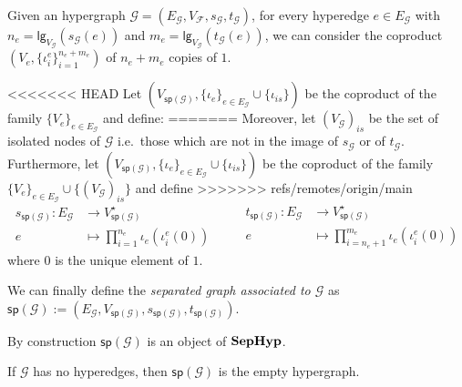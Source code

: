 \documentclass[3p]{elsarticle}
\newcommand{\lgh}{\mathsf{lg}}
\newcommand{\catname}[1]{\textbf{\textup{#1}}}
\newcommand{\shyp}{\catname{SepHyp}}
\renewcommand{\sp}{\mathsf{sp}}
\newcommand{\is}[1]{{#1}_{is}}
\theoremstyle{remark}
\theoremstyle{definition}
\begin{document}
\begin{defi}
Given an hypergraph $\mathcal{\mathcal{G}}=(E_{\mathcal{G}}, V_{\mathcal{F}}, s_{\mathcal{G}}, t_{\mathcal{G}})$, for every hyperedge $e\in E_{\mathcal{G}}$ with $n_e=\lgh_{V_{\mathcal{G}}}(s_{\mathcal{G}}(e))$ and $m_e=\lgh_{V_{\mathcal{G}}}(t_{\mathcal{G}}(e))$, we can consider the coproduct $(V_e, \{\iota^e_{i}\}_{i=1}^{n_e+m_e})$ of $n_e+m_e$ copies of $1$.

<<<<<<< HEAD
Let $(V_{\sp(\mathcal{G})}, \{\iota_e\}_{e\in E_{\mathcal{G}}} \cup \{\iota_{is}\})$ be the coproduct of the family $\{V_{e}\}_{e\in E_\mathcal{G}}$ and define:
=======
 Moreover, let $\is{(V_{\mathcal{G}})}$ be the set of isolated nodes  of $\mathcal{G}$ i.e.~those which are not in the image of $s_{\mathcal{G}}$ or of $t_{\mathcal{G}}$. Furthermore, let $(V_{\sp(\mathcal{G})}, \{\iota_e\}_{e\in E_{\mathcal{G}}} \cup \{\iota_{is}\})$ be the coproduct of the family $\{V_{e}\}_{e\in E_\mathcal{G}} \cup \{\is{(V_{\mathcal{G}})}\}$ and define
>>>>>>> refs/remotes/origin/main
\[\begin{split}
	s_{\sp(\mathcal{G})} \colon E_{\mathcal{G}}&\to V_{\sp(\mathcal{G})}^\star\\
	e &\mapsto \prod_{i=1}^{n_e} \iota_e(\iota^e_{i}(0))
\end{split}\qquad \begin{split}
	t_{\sp(\mathcal{G})} \colon E_{\mathcal{G}}&\to V_{\sp(\mathcal{G})}^\star\\
	e &\mapsto \prod_{i=n_e+1}^{m_e} \iota_e(\iota^e_{i}(0))
\end{split} \]
where $0$ is the unique element of $1$. 

We can finally define the \emph{separated graph associated to $\mathcal{G}$}  as $\sp(\mathcal{G}):= (E_{\mathcal{G}}, V_{\sp(\mathcal{G})}, s_{\sp(\mathcal{G})}, t_{\sp(\mathcal{G})})$.
\end{defi}
\begin{rem}\label{rem:ob}
 By construction $\sp(\mathcal{G})$ is an object of $\shyp$. 
\end{rem}

\begin{exa}\label{ex:empty}
	If $\mathcal{G}$ has no hyperedges, then $\sp(\mathcal{G})$ is the empty hypergraph.
\end{exa}
\end{document}
